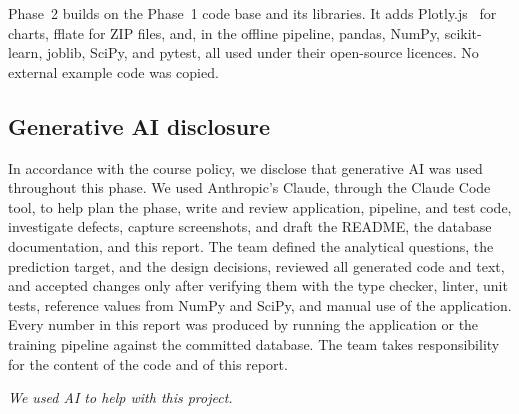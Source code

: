 \documentclass[11pt,a4paper]{article}
\begin{document}
Phase~2 builds on the Phase~1 code base and its libraries. It adds Plotly.js~\cite{plotly} for
charts, fflate for ZIP files, and, in the offline pipeline, pandas, NumPy, scikit-learn,
joblib, SciPy, and pytest, all used under their open-source licences. No external example code
was copied.

\subsection{Generative AI disclosure}

In accordance with the course policy, we disclose that generative AI was used throughout this
phase. We used Anthropic's Claude, through the Claude Code tool, to help plan the phase, write
and review application, pipeline, and test code, investigate defects, capture screenshots, and
draft the README, the database documentation, and this report. The team defined the analytical
questions, the prediction target, and the design decisions, reviewed all generated code and
text, and accepted changes only after verifying them with the type checker, linter, unit tests,
reference values from NumPy and SciPy, and manual use of the application. Every number in this
report was produced by running the application or the training pipeline against the committed
database. The team takes responsibility for the content of the code and of this report.

\renewcommand{\refname}{Bibliography}



\vfill
\noindent\textit{We used AI to help with this project.}
\end{document}
